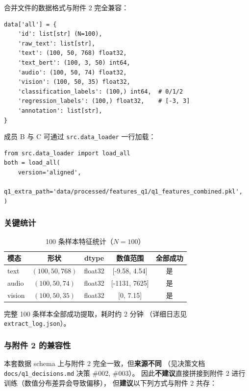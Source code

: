 合并文件的数据格式与附件 2 完全兼容：

\begin{verbatim}
data['all'] = {
    'id': list[str] (N=100),
    'raw_text': list[str],
    'text': (100, 50, 768) float32,
    'text_bert': (100, 3, 50) int64,
    'audio': (100, 50, 74) float32,
    'vision': (100, 50, 35) float32,
    'classification_labels': (100,) int64,  # 0/1/2
    'regression_labels': (100,) float32,    # [-3, 3]
    'annotation': list[str],
}
\end{verbatim}

成员 B 与 C 可通过 \texttt{src.data\_loader} 一行加载：

\begin{verbatim}
from src.data_loader import load_all
both = load_all(
    version='aligned',
    q1_extra_path='data/processed/features_q1/q1_features_combined.pkl',
)
\end{verbatim}

\subsubsection{关键统计}

\begin{table}[h]
\centering
\caption{100 条样本特征统计（$N=100$）}
\label{tab:q1-stats}
\begin{tabular}{lcccc}
\hline
模态 & 形状 & dtype & 数值范围 & 全部成功 \\
\hline
text  & $(100, 50, 768)$  & float32 & [-9.58, 4.54] & 是 \\
audio & $(100, 50, 74)$   & float32 & [-1131, 7625] & 是 \\
vision & $(100, 50, 35)$  & float32 & [0, 7.15]      & 是 \\
\hline
\end{tabular}
\end{table}

完整 100 条样本全部成功提取，耗时约 2 分钟
（详细日志见 \texttt{extract\_log.json}）。

\subsubsection{与附件 2 的兼容性}

本套数据 schema 上与附件 2 完全一致，但\textbf{来源不同}
（见决策文档 \texttt{docs/q1\_decisions.md} 决策 \#002, \#003）。
因此\textbf{不建议}直接拼接到附件 2 进行训练（数值分布差异会导致偏移），
但\textbf{建议}以下列方式与附件 2 共存：

